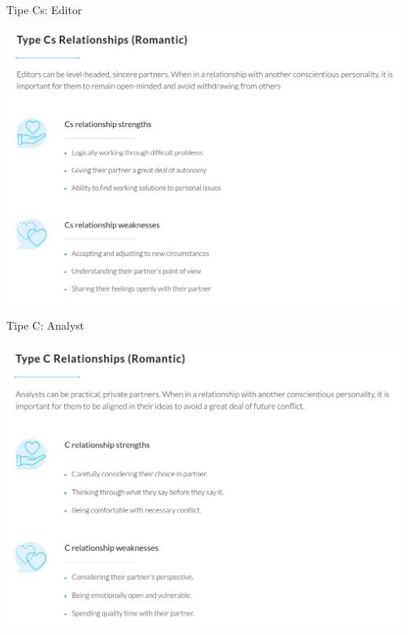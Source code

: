 \documentclass{beamer}
\theoremstyle{mystyle}
\begin{document}
\begin{frame}{Tipe Cs: Editor}
	\begin{center}
		\includegraphics[scale=.275]{images/Cs}
	\end{center}
\end{frame}


\begin{frame}{Tipe C: Analyst}
	\begin{center}
		\includegraphics[scale=.275]{images/C}
	\end{center}
\end{frame}
\end{document}
